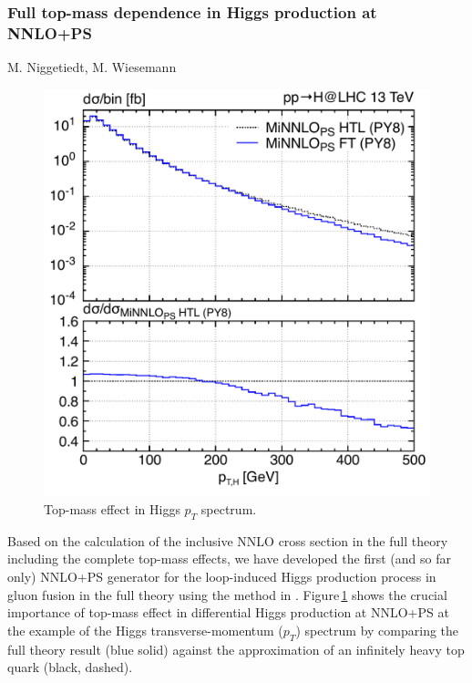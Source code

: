 \documentclass{FBR_Bericht_2025}
\begin{document}
\begin{refsection}
%

\subsubsection{Full top-mass dependence in Higgs production at NNLO+PS}
\begin{Namen}
M. Niggetiedt, M. Wiesemann
\end{Namen}

\begin{figure}[h!]
\begin{center}
\includegraphics[width=0.95\linewidth]{plots/ptH_diphotons_mass_effect.pdf}
\caption{Top-mass effect in Higgs $p_T$ spectrum.}
\label{fig:topmass_Higgs_pT}
\end{center}
\end{figure}
%
Based on the calculation of the inclusive NNLO cross section in the full theory
including the complete top-mass effects,
we have developed the first (and so far only) 
NNLO+PS generator for the loop-induced 
Higgs production process in gluon fusion in the full theory using 
the \minnlo{} method in . Figure\,\ref{fig:topmass_Higgs_pT} shows
the crucial importance of top-mass effect in differential Higgs production
at NNLO+PS at the example of the Higgs transverse-momentum ($p_T$)
spectrum by comparing the full theory result (blue solid) against
the approximation of an infinitely heavy top quark (black, dashed).


\end{refsection}
\end{document}
